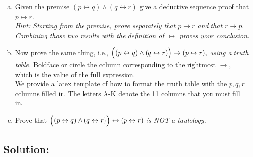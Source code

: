 \documentclass[12pt]{article}
\begin{document}
	\begin{enumerate}[(a)]
		\item Given the premise $(p \leftrightarrow q) \wedge(q \leftrightarrow r)$ give
			a deductive sequence proof that $p \leftrightarrow r.$\\
			{\em \small Hint: Starting from the premise, prove separately that $p \rightarrow r$ and that $r \rightarrow p.$ Combining those two results with the definition of $\leftrightarrow$ proves your conclusion.}

		\item Now prove the same thing, i.e.,
			$\Bigl ((p \leftrightarrow q) \wedge(q \leftrightarrow r)\Bigr)\rightarrow
			(p \leftrightarrow r),$
			{\em using a truth table.} Boldface or circle the column corresponding to
			the rightmost $\rightarrow$, which is the value of the full expression.\\
			We provide a latex template of how to format the truth table with the $p,q,
			r$ columns filled in. The letters A-K denote the 11 columns that you must
			fill in.

		\item Prove that $\Bigl ((p \leftrightarrow q) \wedge(q \leftrightarrow r)\Bigr
			)\leftrightarrow (p \leftrightarrow r)$ {\em is NOT a tautology.}
	\end{enumerate}

	\newpage
	\subsection*{\textbf{Solution:}}
\end{document}

